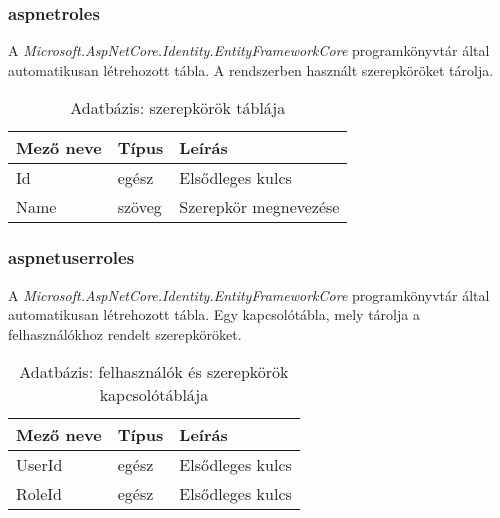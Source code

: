 \subsubsection{aspnetroles}
A \emph{Microsoft.AspNetCore.Identity.EntityFrameworkCore} programkönyvtár által automatikusan létrehozott tábla. A rendszerben használt szerepköröket tárolja.
\begin{table}[H]
	\centering
	\begin{tabular}{ | m{} | m{} | m{} | }
		\hline
		\textbf{Mező neve} & \textbf{Típus} & \textbf{Leírás} \\
		\hline \hline
		Id & egész & Elsődleges kulcs \\
		\hline
		Name & szöveg & Szerepkör megnevezése \\
		\hline
	\end{tabular}
	\caption{Adatbázis: szerepkörök táblája}
	\label{tab:db-roles}
\end{table}
\subsubsection{aspnetuserroles}
A \emph{Microsoft.AspNetCore.Identity.EntityFrameworkCore} programkönyvtár által automatikusan létrehozott tábla. Egy kapcsolótábla, mely tárolja a felhasználókhoz rendelt szerepköröket.
\begin{table}[H]
	\centering
	\begin{tabular}{ | m{} | m{} | m{} | }
		\hline
		\textbf{Mező neve} & \textbf{Típus} & \textbf{Leírás} \\
		\hline \hline
		UserId & egész & Elsődleges kulcs \\
		\hline
		RoleId & egész & Elsődleges kulcs \\
		\hline
	\end{tabular}
	\caption{Adatbázis: felhasználók és szerepkörök kapcsolótáblája}
	\label{tab:db-userroles-map}
\end{table}
